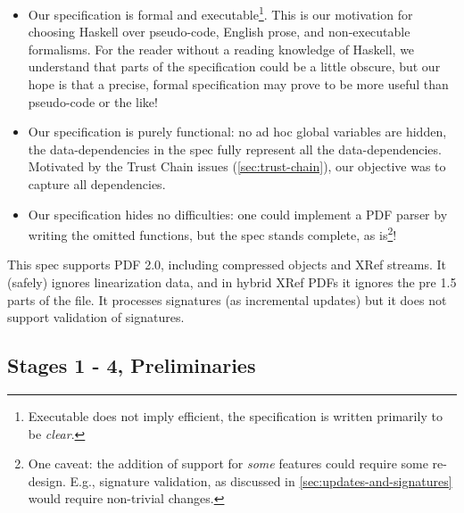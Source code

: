 \begin{itemize}
\item Our specification is formal and executable\footnote{
  Executable does not imply efficient, the specification is written
  primarily to be \emph{clear}.}.
  This is our motivation for choosing Haskell over pseudo-code,
  English prose, and non-executable formalisms.  For the reader
  without a reading knowledge of Haskell, we understand that parts of
  the specification could be a little obscure, but our hope is that a
  precise, formal specification may prove to be more useful than
  pseudo-code or the like!
  
\item Our specification is purely functional: no ad hoc global variables are
  hidden, the data-dependencies in the spec fully represent all the
  data-dependencies.  Motivated by the Trust Chain issues
  (\cref{sec:trust-chain}), our objective was to capture all dependencies.
  
\item Our specification hides no difficulties: one could implement a PDF parser
  by writing the omitted functions, but the spec stands complete, as
  is\footnote{One caveat: the addition of support for \emph{some} features
  could require some re-design.  E.g., signature validation, as discussed in
  \cref{sec:updates-and-signatures} would require non-trivial changes.
  }!
\end{itemize}


This spec supports PDF 2.0, including compressed objects and XRef streams.
%
It (safely) ignores linearization data, and in hybrid XRef PDFs
it ignores the pre 1.5 parts of the file.
It processes signatures (as incremental updates) but it does not support
validation of signatures.


\subsection{Stages 1 - 4, Preliminaries}

\iffalse
\begin{code}
{-# LANGUAGE EmptyDataDecls, TypeOperators, LambdaCase #-}
module Spec where
import           Control.Monad
import           Data.Char
import           Data.Foldable(foldlM)
import qualified Data.Map as M
import           Data.Map(Map)
import           Types
import           Utils
import           Primitives
\end{code}
\fi

